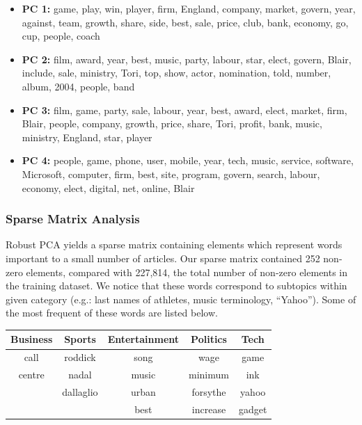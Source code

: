 \documentclass[12pt]{article}
\begin{document}
\newpage
\begin{itemize}
\item {\bf PC 1:} game, play, win, player, firm, England, company, market, govern, year, against, team, growth, share, side, best, sale, price, club, bank, economy, go, cup, people, coach
\item {\bf PC 2:} film, award, year, best, music, party, labour, star, elect, govern, Blair, include, sale, ministry, Tori, top, show, actor, nomination, told, number, album, 2004, people, band
\item {\bf PC 3:}  film, game, party, sale, labour, year, best, award, elect, market, firm, Blair, people, company, growth, price, share, Tori, profit, bank, music, ministry, England, star, player
\item {\bf PC 4:} people, game, phone, user, mobile, year, tech, music, service, software, Microsoft, computer, firm, best, site, program, govern, search, labour, economy, elect, digital,
net, online, Blair
\end{itemize}

\subsubsection{Sparse Matrix Analysis}
Robust PCA yields a sparse matrix containing elements which represent words important to a small number of articles. Our sparse matrix contained 252 non-zero elements, compared with 227,814, the total number of non-zero elements in the training dataset. We notice that these words correspond to subtopics within given category (e.g.: last names of athletes, music terminology, “Yahoo”). Some of the most frequent of these words are listed below.

\begin{center}
\begin{tabular}{c c c c c}
{\bf Business} & {\bf Sports} & {\bf Entertainment} & {\bf Politics} & {\bf Tech} \\ \hline
call & roddick & song & wage & game \\
centre & nadal & music & minimum & ink \\
 & dallaglio & urban & forsythe & yahoo \\
 & & best & increase & gadget \\
\end{tabular}
\end{center}





\end{document}
